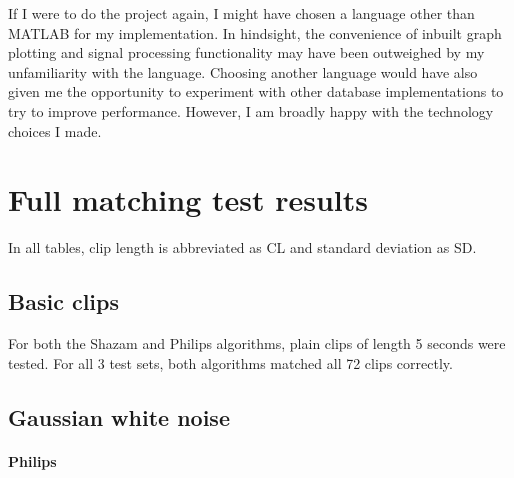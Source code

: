 \documentclass[12pt,a4paper,twoside,openright]{report}
\begin{document}
If I were to do the project again, I might have chosen a language other than MATLAB for my implementation. In hindsight, the convenience of inbuilt graph plotting and signal processing functionality may have been outweighed by my unfamiliarity with the language. Choosing another language would have also given me the opportunity to experiment with other database implementations to try to improve performance. However, I am broadly happy with the technology choices I made.





\appendix



\chapter{Full matching test results}

In all tables, clip length is abbreviated as CL and standard deviation as SD.


\section{Basic clips}

For both the Shazam and Philips algorithms, plain clips of length 5 seconds were tested. For all 3 test sets, both algorithms matched all 72 clips correctly.

\section{Gaussian white noise}

\subsubsection{Philips}
\end{document}
